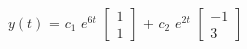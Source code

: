 \documentclass[preview]{standalone}
\begin{document}
\centering $y(t)$ = $c_1$ $e^{6t}$ $\begin{bmatrix} 1 \\ 1 \end{bmatrix}$ + $c_2$ $e^{2t}$ $\begin{bmatrix} -1 \\ 3 \end{bmatrix}$
\end{document}
